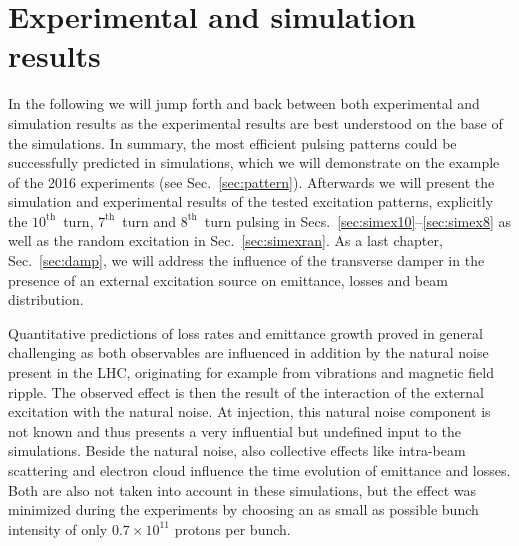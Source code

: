 \documentclass[%
 reprint,
 amsmath,amssymb,
 aps,
prstab,
]{revtex4-1}
\begin{document}
\section{Experimental and simulation results\label{sec:simex}}
In the following we will jump forth and back between both experimental and simulation results as the experimental results are best understood on the base of the simulations. In summary, the most efficient pulsing patterns could be successfully predicted in simulations, which we will demonstrate on the example of the 2016 experiments (see Sec.~\ref{sec:pattern}). Afterwards we will present the simulation and experimental results of the tested excitation patterns, explicitly the $10^{\mathrm{th}}$~turn, $7^{\mathrm{th}}$~turn and $8^{\mathrm{th}}$~turn pulsing in Secs.~\ref{sec:simex10}--\ref{sec:simex8} as well as the random excitation in Sec.~\ref{sec:simexran}. As a last chapter, Sec.~\ref{sec:damp}, we will address the influence of the transverse damper in the presence of an external excitation source on emittance, losses and beam distribution.

Quantitative predictions of loss rates and emittance growth proved in general challenging as both observables are influenced in addition by the natural noise present in the LHC, originating for example from vibrations and magnetic field ripple. The observed effect is then the result of the interaction of the external excitation with the natural noise. At injection, this natural noise component is not known and thus presents a very influential but undefined input to the simulations. Beside the natural noise, also collective effects like intra-beam scattering and electron cloud influence the time evolution of emittance and losses. Both are also not taken into account in these simulations, but the effect was minimized during the experiments by choosing an as small as possible bunch intensity of only $0.7\times10^{11}$ protons per bunch.
\end{document}
